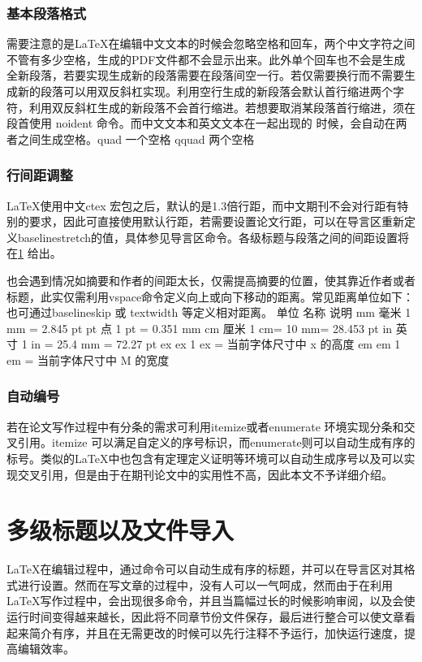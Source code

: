 \subsubsection{基本段落格式}
需要注意的是\LaTeX 在编辑中文文本的时候会忽略空格和回车，两个中文字符之间不管有多少空格，生成的PDF文件都不会显示出来。此外单个回车也不会是生成全新段落，若要实现生成新的段落需要在段落间空一行。若仅需要换行而不需要生成新的段落可以用双反斜杠实现。利用空行生成的新段落会默认首行缩进两个字符，利用双反斜杠生成的新段落不会首行缩进。若想要取消某段落首行缩进，须在段首使用 noident 命令。而中文文本和英文文本在一起出现的 时候，会自动在两者之间生成空格。quad 一个空格  qquad 两个空格  

\subsubsection{行间距调整}
\LaTeX 使用中文ctex 宏包之后，默认的是1.3倍行距，而中文期刊不会对行距有特别的要求，因此可直接使用默认行距，若需要设置论文行距，可以在导言区重新定义baselinestretch的值，具体参见导言区命令。各级标题与段落之间的间距设置将在\ref{多级标题}%
给出。

也会遇到情况如摘要和作者的间距太长，仅需提高摘要的位置，使其靠近作者或者标题，此实仅需利用vspace命令定义向上或向下移动的距离。常见距离单位如下：也可通过baselineskip 或 textwidth 等定义相对距离。
单位 	名称 	说明
mm 	毫米 	1 mm = 2.845 pt
pt 	点 	1 pt = 0.351 mm
cm 	厘米 	1 cm= 10 mm= 28.453 pt
in 	英寸 	1 in = 25.4 mm = 72.27 pt
ex 	ex 	1 ex = 当前字体尺寸中 x 的高度
em 	em 	1 em = 当前字体尺寸中 M 的宽度

\subsubsection{自动编号} \label{自动编号}
若在论文写作过程中有分条的需求可利用itemize或者enumerate 环境实现分条和交叉引用。itemize 可以满足自定义的序号标识，而enumerate则可以自动生成有序的标号。类似的\LaTeX 中也包含有定理定义证明等环境可以自动生成序号以及可以实现交叉引用，但是由于在期刊论文中的实用性不高，因此本文不予详细介绍。

\section{多级标题以及文件导入} \label{多级标题}
\LaTeX 在编辑过程中，通过命令可以自动生成有序的标题，并可以在导言区对其格式进行设置。然而在写文章的过程中，没有人可以一气呵成，然而由于在利用\LaTeX 写作过程中，会出现很多命令，并且当篇幅过长的时候影响审阅，以及会使运行时间变得越来越长，因此将不同章节份文件保存，最后进行整合可以使文章看起来简介有序，并且在无需更改的时候可以先行注释不予运行，加快运行速度，提高编辑效率。 
